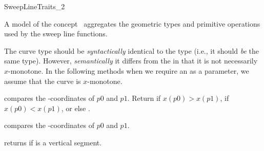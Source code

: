 

\begin{ccRefConcept}{SweepLineTraits_2}


\ccDefinition
  
A model of the concept \ccRefName\ aggregates the geometric types and
primitive operations used by the sweep line functions.


\ccTypes


  The curve type  should be {\it syntactically} identical
  to the  type (i.e., it should {\em be} the same
  type).  However, {\it semantically} it differs from the
   in that it is not necessarily $x$-monotone. In the
  following methods when we require an  as a parameter,
  we assume that the curve is $x$-monotone.


\ccOperations

     {compares the -coordinates
       of $p0$ and $p1$.  Return  if $x(p0) >
       x(p1)$,  if $x(p0) < x(p1)$, or else
       .  }
    
     {compares the
       -coordinates of $p0$ and $p1$.}


   {returns  if  is a vertical segment.}
        

\end{ccRefConcept}
